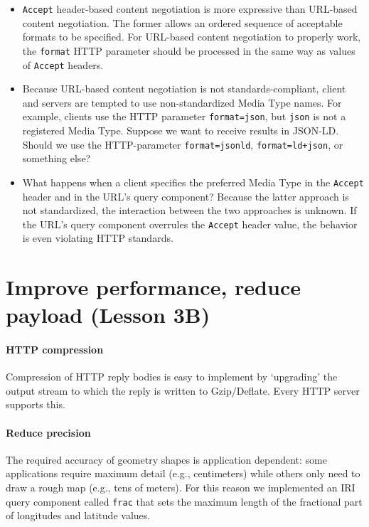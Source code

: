 \documentclass[a4paper]{scrartcl}
\newcommand{\textt}[1]{{\small \texttt{#1}}}
\begin{document}
\begin{itemize}

\item \textt{Accept} header-based content negotiation is more
  expressive than URL-based content negotiation.  The former allows an
  ordered sequence of acceptable formats to be specified.  For
  URL-based content negotiation to properly work, the \textt{format}
  HTTP parameter should be processed in the same way as values of
  \textt{Accept} headers.

\item Because URL-based content negotiation is not
  standards-compliant, client and servers are tempted to use
  non-standardized Media Type names.  For example, clients use the
  HTTP parameter \textt{format=json}, but \textt{json} is not a
  registered Media Type.  Suppose we want to receive results in
  JSON-LD.  Should we use the HTTP-parameter \textt{format=jsonld},
  \textt{format=ld+json}, or something else?

\item What happens when a client specifies the preferred Media Type in
  the \textt{Accept} header and in the URL's query component?  Because
  the latter approach is not standardized, the interaction between the
  two approaches is unknown.  If the URL's query component overrules
  the \textt{Accept} header value, the behavior is even violating HTTP
  standards.
  
\end{itemize}


\section{Improve performance, reduce payload (Lesson 3B)}
\label{sec:http_compression}
\label{sec:reduce_precision}
\label{sec:clustering}

\paragraph{HTTP compression}
Compression of HTTP reply bodies is easy to implement by `upgrading'
the output stream to which the reply is written to Gzip/Deflate.
Every HTTP server supports this.

\paragraph{Reduce precision}
The required accuracy of geometry shapes is application dependent:
some applications require maximum detail (e.g., centimeters) while
others only need to draw a rough map (e.g., tens of meters).  For this
reason we implemented an IRI query component called \textt{frac} that
sets the maximum length of the fractional part of longitudes and
latitude values.
\end{document}
